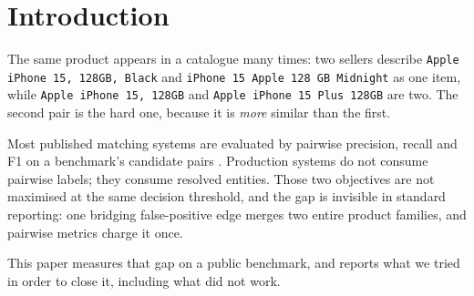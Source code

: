 \documentclass[conference]{IEEEtran}
\begin{document}
\section{Introduction}
The same product appears in a catalogue many times: two sellers describe
\texttt{Apple iPhone 15, 128GB, Black} and \texttt{iPhone 15 Apple 128 GB Midnight} as one item, while
\texttt{Apple iPhone 15, 128GB} and \texttt{Apple iPhone 15 Plus 128GB} are two. The second pair is the
hard one, because it is \emph{more} similar than the first.

Most published matching systems are evaluated by pairwise precision, recall and F1 on a benchmark's
candidate pairs \cite{peeters2024wdc,li2020ditto}. Production systems do not consume pairwise labels; they
consume resolved entities. Those two objectives are not maximised at the same decision threshold, and the
gap is invisible in standard reporting: one bridging false-positive edge merges two entire product
families, and pairwise metrics charge it once.

This paper measures that gap on a public benchmark, and reports what we tried in order to close it, including
what did not work.
\end{document}
